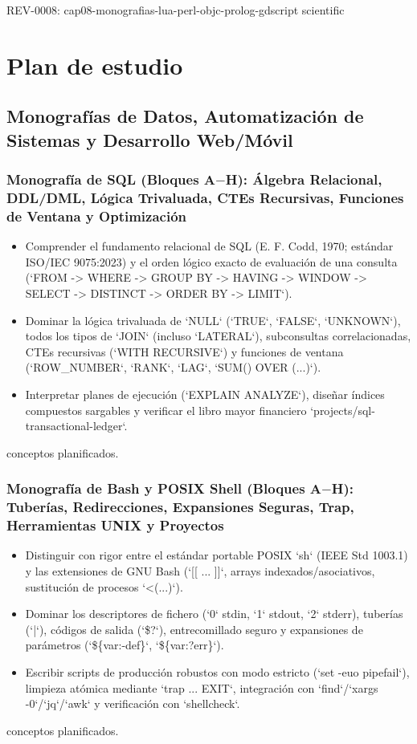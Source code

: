 \documentclass{book}
\begin{document}
\noindent REV-0008: cap08-monografias-lua-perl-objc-prolog-gdscript scientific
\chapter{Plan de estudio}

\section*{Monografías de Datos, Automatización de Sistemas y Desarrollo Web/Móvil}

\subsection*{\checkmark Monografía de SQL (Bloques A\(-\)H): Álgebra Relacional, DDL/DML, Lógica Trivaluada, CTEs Recursivas, Funciones de Ventana y Optimización}
\begin{itemize}
\item Comprender el fundamento relacional de SQL (E. F. Codd, 1970; estándar ISO/IEC 9075:2023) y el orden lógico exacto de evaluación de una consulta (`FROM -> WHERE -> GROUP BY -> HAVING -> WINDOW -> SELECT -> DISTINCT -> ORDER BY -> LIMIT`).
\item Dominar la lógica trivaluada de `NULL` (`TRUE`, `FALSE`, `UNKNOWN`), todos los tipos de `JOIN` (incluso `LATERAL`), subconsultas correlacionadas, CTEs recursivas (`WITH RECURSIVE`) y funciones de ventana (`ROW\_NUMBER`, `RANK`, `LAG`, `SUM() OVER (...)`).
\item Interpretar planes de ejecución (`EXPLAIN ANALYZE`), diseñar índices compuestos sargables y verificar el libro mayor financiero `projects/sql-transactional-ledger`.
\end{itemize}
 conceptos planificados.

\subsection*{\checkmark Monografía de Bash y POSIX Shell (Bloques A\(-\)H): Tuberías, Redirecciones, Expansiones Seguras, Trap, Herramientas UNIX y Proyectos}
\begin{itemize}
\item Distinguir con rigor entre el estándar portable POSIX `sh` (IEEE Std 1003.1) y las extensiones de GNU Bash (`[[ ... ]]`, arrays indexados/asociativos, sustitución de procesos `<(...)`).
\item Dominar los descriptores de fichero (`0` stdin, `1` stdout, `2` stderr), tuberías (`|`), códigos de salida (`\$?`), entrecomillado seguro y expansiones de parámetros (`\$\{var:-def\}`, `\$\{var:?err\}`).
\item Escribir scripts de producción robustos con modo estricto (`set -euo pipefail`), limpieza atómica mediante `trap ... EXIT`, integración con `find`/`xargs -0`/`jq`/`awk` y verificación con `shellcheck`.
\end{itemize}
 conceptos planificados.
\end{document}
